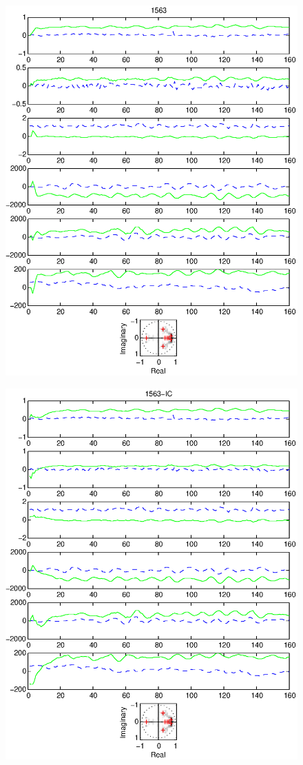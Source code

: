 \documentclass{article}
\begin{document}
\begin{figure}[htb!]
\centering
\includegraphics{1563.eps}
\end{figure}\clearpage
\begin{figure}[htb!]
\centering
\includegraphics{1563_ic.eps}
\end{figure}\clearpage
\end{document}
